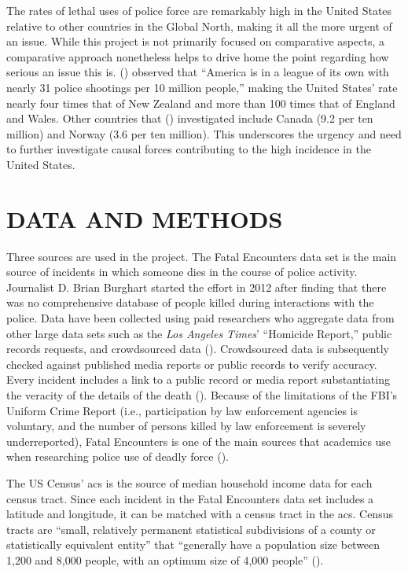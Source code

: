 \documentclass[12pt]{article}
\begin{document}
The rates of lethal uses of police force are remarkably high in the United States relative to other countries in the Global North, making it all the more urgent of an issue. While this project is not primarily focused on comparative aspects, a comparative approach nonetheless helps to drive home the point regarding how serious an issue this is. \citeauthor{espinerLicenceKillStartling2022} (\citeyear{espinerLicenceKillStartling2022}) observed that “America is in a league of its own with nearly 31 police shootings per 10 million people,” making the United States' rate nearly four times that of New Zealand and more than 100 times that of England and Wales. Other countries that \citeauthor{espinerLicenceKillStartling2022} (\citeyear{espinerLicenceKillStartling2022}) investigated include Canada (9.2 per ten million) and Norway (3.6 per ten million). This underscores the urgency and need to further investigate causal forces contributing to the high incidence in the United States.

\section{DATA AND METHODS}

Three sources are used in the project. The Fatal Encounters data set is the main source of incidents in which someone dies in the course of police activity. Journalist D. Brian Burghart started the effort in 2012 after finding that there was no comprehensive database of people killed during interactions with the police. Data have been collected using paid researchers who aggregate data from other large data sets such as the \textit{Los Angeles Times}’ “Homicide Report,” public records requests, and crowdsourced data (\cite{burghartMeFatalEncounters}). Crowdsourced data is subsequently checked against published media reports or public records to verify accuracy. Every incident includes a link to a public record or media report substantiating the veracity of the details of the death (\cite{burghartMeFatalEncounters}). Because of the limitations of the FBI’s Uniform Crime Report (i.e., participation by law enforcement agencies is voluntary, and the number of persons killed by law enforcement is severely underreported), Fatal Encounters is one of the main sources that academics use when researching police use of deadly force (\cite{feldmanKilledPoliceValidity2017, feldmanQuantifyingUnderreportingLawenforcementrelated2017, feldmanPoliceRelatedDeathsNeighborhood2019}).

The US Census’ \acrfull{acs} is the source of median household income data for each census tract. Since each incident in the Fatal Encounters data set includes a latitude and longitude, it can be matched with a census tract in the \acrshort{acs}. Census tracts are “small, relatively permanent statistical subdivisions of a county or statistically equivalent entity” that “generally have a population size between 1,200 and 8,000 people, with an optimum size of 4,000 people” (\cite{bureauGlossary}).
\end{document}
